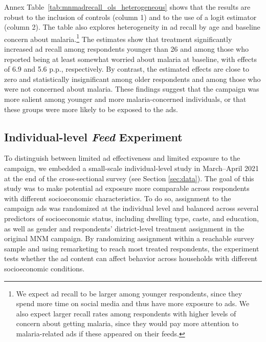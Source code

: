 \begin{table}[h!]
    \centering
    \caption{Ad recall at endline} 
    \footnotesize
    
    \label{tab:mnmadrecall_ols}
\end{table}


Annex Table~\ref{tab:mnmadrecall_ols_heterogeneous} shows that the results are robust to the inclusion of controls (column 1) and to the use of a logit estimator (column 2). The table also explores heterogeneity in ad recall by age and baseline concern about malaria.\footnote{We expect ad recall to be larger among younger respondents, since they spend more time on social media and thus have more exposure to ads. We also expect larger recall rates among respondents with higher levels of concern about getting malaria, since they would pay more attention to malaria-related ads if these appeared on their feeds.} The estimates show that treatment significantly increased ad recall among respondents younger than 26 and among those who reported being at least somewhat worried about malaria at baseline, with effects of 6.9 and 5.6 p.p., respectively. By contrast, the estimated effects are close to zero and statistically insignificant among older respondents and among those who were not concerned about malaria. These findings suggest that the campaign was more salient among younger and more malaria-concerned individuals, or that these groups were more likely to be exposed to the ads.






\subsection{Individual-level \textit{Feed} Experiment}

To distinguish between limited ad effectiveness and limited exposure to the campaign, we embedded a small-scale individual-level study in March--April 2021 at the end of the cross-sectional survey (see Section \ref{sec:data}). The goal of this study was to make potential ad exposure more comparable across respondents with different socioeconomic characteristics. To do so, assignment to the campaign ads was randomized at the individual level and balanced across several predictors of socioeconomic status, including dwelling type, caste, and education, as well as gender and respondents’ district-level treatment assignment in the original MNM campaign. By randomizing assignment within a reachable survey sample and using remarketing to reach most treated respondents, the experiment tests whether the ad content can affect behavior across households with different socioeconomic conditions.


